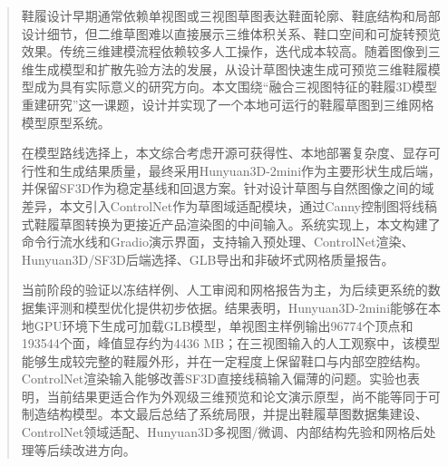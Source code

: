 

\begin{abstract}
  鞋履设计早期通常依赖单视图或三视图草图表达鞋面轮廓、鞋底结构和局部设计细节，但二维草图难以直接展示三维体积关系、鞋口空间和可旋转预览效果。传统三维建模流程依赖较多人工操作，迭代成本较高。随着图像到三维生成模型和扩散先验方法的发展，从设计草图快速生成可预览三维鞋履模型成为具有实际意义的研究方向。本文围绕“融合三视图特征的鞋履3D模型重建研究”这一课题，设计并实现了一个本地可运行的鞋履草图到三维网格模型原型系统。

  在模型路线选择上，本文综合考虑开源可获得性、本地部署复杂度、显存可行性和生成结果质量，最终采用Hunyuan3D-2mini作为主要形状生成后端，并保留SF3D作为稳定基线和回退方案。针对设计草图与自然图像之间的域差异，本文引入ControlNet作为草图域适配模块，通过Canny控制图将线稿式鞋履草图转换为更接近产品渲染图的中间输入。系统实现上，本文构建了命令行流水线和Gradio演示界面，支持输入预处理、ControlNet渲染、Hunyuan3D/SF3D后端选择、GLB导出和非破坏式网格质量报告。

  当前阶段的验证以冻结样例、人工审阅和网格报告为主，为后续更系统的数据集评测和模型优化提供初步依据。结果表明，Hunyuan3D-2mini能够在本地GPU环境下生成可加载GLB模型，单视图主样例输出96774个顶点和193544个面，峰值显存约为4436 MB；在三视图输入的人工观察中，该模型能够生成较完整的鞋履外形，并在一定程度上保留鞋口与内部空腔结构。ControlNet渲染输入能够改善SF3D直接线稿输入偏薄的问题。实验也表明，当前结果更适合作为外观级三维预览和论文演示原型，尚不能等同于可制造结构模型。本文最后总结了系统局限，并提出鞋履草图数据集建设、ControlNet领域适配、Hunyuan3D多视图/微调、内部结构先验和网格后处理等后续改进方向。
\end{abstract}


